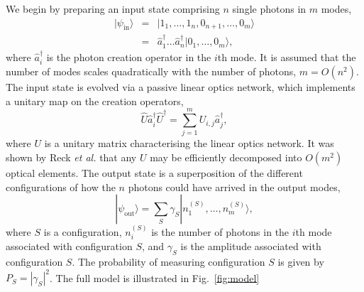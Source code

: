 \documentclass[aps,pra,twocolumn,amsmath,amssymb,nofootinbib,superscriptaddress]{revtex4}
\newcommand{\ket}[1]{|#1\rangle}
\begin{document}
We begin by preparing an input state comprising $n$ single photons in $m$ modes,
\begin{eqnarray} \label{eq:input_state}
\ket{\psi_\mathrm{in}} &=& \ket{1_1,\dots,1_n,0_{n+1},\dots,0_m} \nonumber \\
&=& \hat{a}^\dag_1 \dots \hat{a}^\dag_n \ket{0_1,\dots,0_m},
\end{eqnarray}
where $\hat{a}^\dag_i$ is the photon creation operator in the $i$th mode. It is assumed that the number of modes scales quadratically with the number of photons, \mbox{$m=O(n^2)$}. The input state is evolved via a passive linear optics network, which implements a unitary map on the creation operators,
\begin{equation}
\hat{U}\hat{a}_i^\dag\hat{U}^\dag = \sum_{j=1}^m U_{i,j} \hat{a}_j^\dag,
\end{equation}
where $U$ is a unitary matrix characterising the linear optics network. It was shown by Reck \emph{et al.} \cite{bib:Reck94} that any $U$ may be efficiently decomposed into $O(m^2)$ optical elements. The output state is a superposition of the different configurations of how the $n$ photons could have arrived in the output modes,
\begin{equation}
\ket{\psi_\mathrm{out}} = \sum_S \gamma_S \ket{n_1^{(S)},\dots,n_m^{(S)}},
\end{equation}
where $S$ is a configuration, $n_i^{(S)}$ is the number of photons in the $i$th mode associated with configuration $S$, and $\gamma_S$ is the amplitude associated with configuration $S$. The probability of measuring configuration $S$ is given by \mbox{$P_S = |\gamma_S|^2$}. The full model is illustrated in Fig.~\ref{fig:model}
\end{document}
